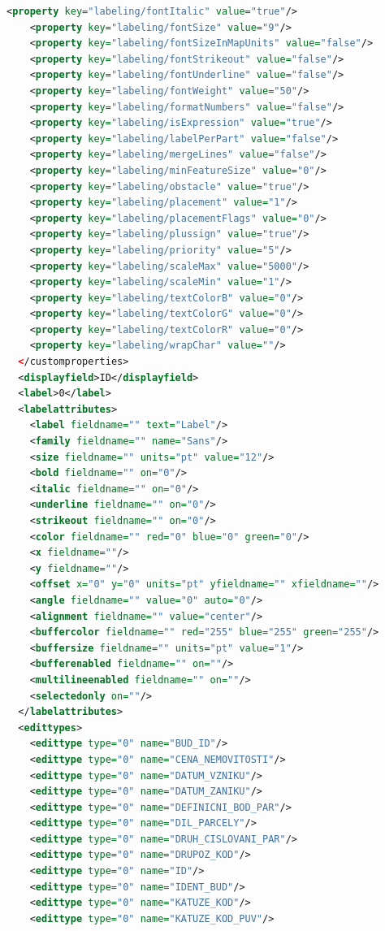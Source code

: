 \documentclass[a4paper,12pt,oneside]{book}
\begin{document}
\begin{lstlisting}[language=XML]
    <property key="labeling/fontItalic" value="true"/>
    <property key="labeling/fontSize" value="9"/>
    <property key="labeling/fontSizeInMapUnits" value="false"/>
    <property key="labeling/fontStrikeout" value="false"/>
    <property key="labeling/fontUnderline" value="false"/>
    <property key="labeling/fontWeight" value="50"/>
    <property key="labeling/formatNumbers" value="false"/>
    <property key="labeling/isExpression" value="true"/>
    <property key="labeling/labelPerPart" value="false"/>
    <property key="labeling/mergeLines" value="false"/>
    <property key="labeling/minFeatureSize" value="0"/>
    <property key="labeling/obstacle" value="true"/>
    <property key="labeling/placement" value="1"/>
    <property key="labeling/placementFlags" value="0"/>
    <property key="labeling/plussign" value="true"/>
    <property key="labeling/priority" value="5"/>
    <property key="labeling/scaleMax" value="5000"/>
    <property key="labeling/scaleMin" value="1"/>
    <property key="labeling/textColorB" value="0"/>
    <property key="labeling/textColorG" value="0"/>
    <property key="labeling/textColorR" value="0"/>
    <property key="labeling/wrapChar" value=""/>
  </customproperties>
  <displayfield>ID</displayfield>
  <label>0</label>
  <labelattributes>
    <label fieldname="" text="Label"/>
    <family fieldname="" name="Sans"/>
    <size fieldname="" units="pt" value="12"/>
    <bold fieldname="" on="0"/>
    <italic fieldname="" on="0"/>
    <underline fieldname="" on="0"/>
    <strikeout fieldname="" on="0"/>
    <color fieldname="" red="0" blue="0" green="0"/>
    <x fieldname=""/>
    <y fieldname=""/>
    <offset x="0" y="0" units="pt" yfieldname="" xfieldname=""/>
    <angle fieldname="" value="0" auto="0"/>
    <alignment fieldname="" value="center"/>
    <buffercolor fieldname="" red="255" blue="255" green="255"/>
    <buffersize fieldname="" units="pt" value="1"/>
    <bufferenabled fieldname="" on=""/>
    <multilineenabled fieldname="" on=""/>
    <selectedonly on=""/>
  </labelattributes>
  <edittypes>
    <edittype type="0" name="BUD_ID"/>
    <edittype type="0" name="CENA_NEMOVITOSTI"/>
    <edittype type="0" name="DATUM_VZNIKU"/>
    <edittype type="0" name="DATUM_ZANIKU"/>
    <edittype type="0" name="DEFINICNI_BOD_PAR"/>
    <edittype type="0" name="DIL_PARCELY"/>
    <edittype type="0" name="DRUH_CISLOVANI_PAR"/>
    <edittype type="0" name="DRUPOZ_KOD"/>
    <edittype type="0" name="ID"/>
    <edittype type="0" name="IDENT_BUD"/>
    <edittype type="0" name="KATUZE_KOD"/>
    <edittype type="0" name="KATUZE_KOD_PUV"/>

\end{lstlisting}
\end{document}
